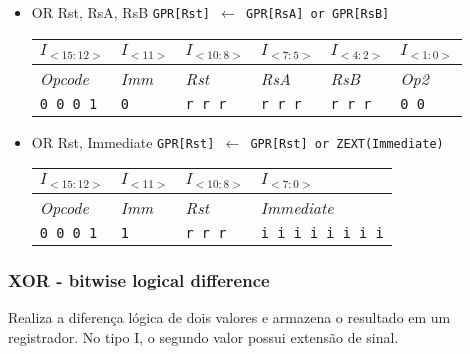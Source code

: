 \documentclass{extreport}
\begin{document}
\begin{itemize}
\item OR Rst, RsA, RsB
\subitem \texttt{GPR[Rst] $\leftarrow$ GPR[RsA] or GPR[RsB]}
\begin{table}[ht!]
\centering
\begin{tabular}{|p{1.6cm}|p{1.6cm}|p{1.6cm}|p{1.6cm}|p{1.6cm}|p{1.6cm}|}
\hline
$I_{<15:12>}$ & $I_{<11>}$ & $I_{<10:8>}$ & $I_{<7:5>}$ & $I_{<4:2>}$ & $I_{<1:0>}$ \\ \hline
\textit{Opcode} & \textit{Imm} & \textit{Rst} & \textit{RsA} & \textit{RsB} & \textit{Op2} \\ \hline
\texttt{0 0 0 1} & \texttt{0} & \texttt{r r r} & \texttt{r r r} & \texttt{r r r} & \texttt{0 0} \\ \hline
\end{tabular}
\end{table}

\item OR Rst, Immediate
\subitem \texttt{GPR[Rst] $\leftarrow$ GPR[Rst] or ZEXT(Immediate)}
\begin{table}[ht!]
\centering
\begin{tabular}{|p{1.6cm}|p{1.6cm}|p{1.6cm}|p{5.65cm}|}
\hline
$I_{<15:12>}$ & $I_{<11>}$ & $I_{<10:8>}$ & $I_{<7:0>}$ \\ \hline
\textit{Opcode} & \textit{Imm} & \textit{Rst} & \textit{Immediate} \\ \hline
\texttt{0 0 0 1} & \texttt{1} & \texttt{r r r} & \texttt{i i i i i i i i} \\ \hline
\end{tabular}
\end{table}
\end{itemize}

\subsubsection{XOR - bitwise logical difference}
Realiza a diferença lógica de dois valores e armazena o resultado em um registrador. No tipo I, o segundo valor possui extensão de sinal.
\end{document}
